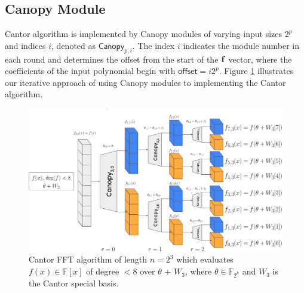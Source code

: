 \subsection{Canopy Module} \label{sec:Canopy}
Cantor algorithm is implemented by Canopy modules of varying input sizes $2^p$ and indices $i$, denoted as $\mathsf{Canopy}_{p, i}$. The index $i$ indicates the module number in each round and determines the offset from the start of the ${\bf{f}}$ vector, where the coefficients of the input polynomial begin with $\mathsf{offset} = i2^p$. Figure \ref{fig:Canopy} illustrates our iterative approach of using Canopy modules to implementing the Cantor algorithm.


 \begin{figure}
	     \centering
	     \includegraphics[width=\linewidth]{Figures/Canopy.jpg}
	     \caption[The Canopy module in the Cantor FFT algorithm]{\small Cantor FFT algorithm of length $n = 2^3$ which evaluates $f(x)\in\mathbb{F}[x]$ of degree $<8$ over $\theta$ + $W_3$, where $\theta \in \mathbb{F}_{2^k}$ and $W_3$ is the Cantor special basis.}
	     \label{fig:Canopy}
	 \end{figure}%

